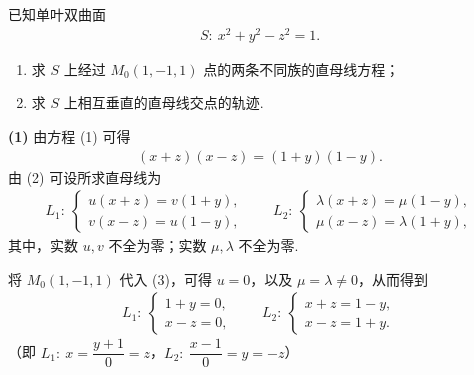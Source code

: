 
已知单叶双曲面
\begin{align*}
S:\ x^2+y^2-z^2=1. \tag{1}
\end{align*}
\begin{enumerate}[label=(\arabic*)]
  \item 求 $S$ 上经过 $M_0(1,-1,1)$ 点的两条不同族的直母线方程；
  \item 求 $S$ 上相互垂直的直母线交点的轨迹.
\end{enumerate}
\begin{solution}
\textbf{(1)} 由方程 (1) 可得
\begin{align*}
(x+z)(x-z)=(1+y)(1-y). \tag{2}
\end{align*}
由 (2) 可设所求直母线为
\begin{align*}
L_1:\ \begin{cases}
  u(x+z)=v(1+y),\\
  v(x-z)=u(1-y),
\end{cases}
\qquad
L_2:\ \begin{cases}
  \lambda(x+z)=\mu(1-y),\\
  \mu(x-z)=\lambda(1+y),
\end{cases} \tag{3}
\end{align*}
其中，实数 $u,v$ 不全为零；实数 $\mu,\lambda$ 不全为零.

将 $M_0(1,-1,1)$ 代入 (3)，可得 $u=0$，以及 $\mu=\lambda\ne0$，从而得到
\begin{align*}
L_1:\ \begin{cases}
  1+y=0,\\
  x-z=0,
\end{cases}
\qquad
L_2:\ \begin{cases}
  x+z=1-y,\\
  x-z=1+y.
\end{cases} \tag{4}
\end{align*}
（即 $L_1:\ x=\dfrac{y+1}{0}=z$，$L_2:\ \dfrac{x-1}{0}=y=-z$）


\end{solution}
